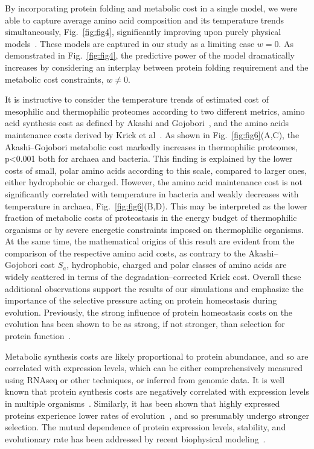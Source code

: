 \documentclass[10pt,letterpaper]{article}
\begin{document}
By incorporating protein folding and metabolic cost in a single model, we were able to capture average amino acid composition and its temperature trends simultaneously, Fig.~\ref{fig:fig4}, significantly improving upon purely physical models~\cite{Berezovsky2007Positive,Venev2015Massively}. These  models are captured in our study as a limiting case $w=0$. As demonstrated in Fig.~\ref{fig:fig4}, the predictive power of the model dramatically increases by considering an interplay between protein folding requirement and the metabolic cost constraints, $w\neq 0$.

It is instructive to consider the temperature trends of estimated cost of mesophilic and thermophilic proteomes according to two different metrics, amino acid synthesis cost as defined by Akashi and Gojobori~\cite{Akashi2002Metabolic}, and the amino acids maintenance costs derived by Krick et al~\cite{Krick2014Amino}. As shown in Fig.~\ref{fig:fig6}(A,C), the Akashi--Gojobori metabolic cost markedly increases in thermophilic proteomes, p\textless0.001 both for archaea and bacteria. This finding is explained by the lower costs of small, polar amino acids according to this scale, compared to larger ones, either hydrophobic or charged. However, the amino acid maintenance cost is not significantly correlated with temperature in bacteria and weakly decreases with temperature in archaea, Fig.~\ref{fig:fig6}(B,D). This may be interpreted as the lower fraction of metabolic costs  of proteostasis in the energy budget of thermophilic organisms or by severe energetic constraints imposed on thermophilic organisms. At the same time, the mathematical origins of this result are evident from the comparison of the respective amino acid costs, as contrary to the Akashi--Gojobori cost $S_{a}$, hydrophobic, charged and polar classes of amino acids are widely scattered in terms of the degradation--corrected Krick cost. Overall these additional observations support the results of our simulations and emphasize the importance of the selective pressure acting on protein homeostasis during evolution. Previously, the strong influence of protein homeostasis costs on the evolution has been shown to be as strong, if not stronger, than selection for protein function~\cite{Assis2014Conserved}.

Metabolic synthesis costs are likely proportional to protein abundance, and so are correlated with expression levels, which can be either comprehensively measured using RNAseq or other techniques, or inferred from genomic data. It is well known that protein synthesis costs are negatively correlated with expression levels in multiple organisms~\cite{Akashi2002Metabolic,Seligmann2003CostMinimization,Heizer2006Amino,Raiford2008Do}. Similarly, it has been shown that highly expressed proteins experience lower rates of evolution~\cite{Pal2001Highly,Rocha2004An,Drummond2005Why}, and so presumably undergo stronger selection. The mutual dependence of protein expression levels, stability, and evolutionary rate has been addressed by recent biophysical modeling~\cite{Serohijos2012Protein}.
\end{document}
